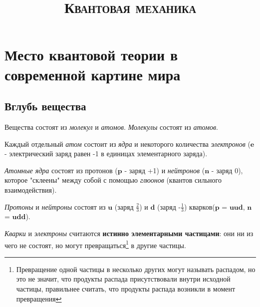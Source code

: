

\setmainfont{Times New Roman}

\title{\textbf{\textsc{Квантовая механика}}}
\author{}
\date{} %
\linespread{1.3} %


	
	\maketitle %
	\thispagestyle{empty} %
	\clearpage %
	\setcounter{page}{1} %
		
	\tableofcontents
	\clearpage
	\section{Место квантовой теории в современной картине мира}
	\subsection{Вглубь вещества}
	                 
    Вещества состоят из \textit{молекул} и \textit{атомов}. \textit{Молекулы} состоят из \textit{атомов}.
    \par Каждый отдельный \textit{атом} состоит из \textit{ядра} и некоторого количества \textit{электронов} ($\boldsymbol{e}$ - электрический заряд равен -1 в единицах элементарного заряда).
    \par \textit{Атомные ядра} состоят из протонов ($\boldsymbol{p}$ - заряд +1) и \textit{нейтронов} ($\boldsymbol{n}$ - заряд 0), которое "склеены" между собой с помощью \textit{глюонов} (квантов сильного взаимодействия).
    \par \textit{Протоны} и \textit{нейтроны} состоят из $\boldsymbol{u}$ (заряд $\frac{2}{3}$) и $\boldsymbol{d}$ (заряд -$\frac{1}{3}$) кварков($\boldsymbol{p}$ = $\boldsymbol{u}$$\boldsymbol{u}$$\boldsymbol{d}$, $\boldsymbol{n}$ = $\boldsymbol{u}$$\boldsymbol{d}$$\boldsymbol{d}$). 
    \par \textit{Кварки} и \textit{электроны} считаются \textbf{истинно элементарными частицами}: они ни из чего не состоят, но могут превращаться\footnote{Превращение одной частицы в несколько других могут называть распадом, но это не значит, что продукты распада присутствовали внутри исходной частицы, правильнее считать, что продукты распада возникли в момент превращения} в другие частицы.
